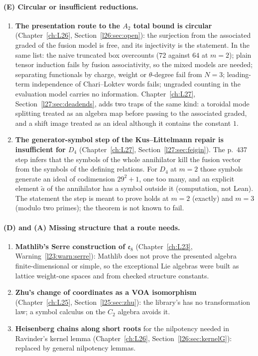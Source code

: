 \paragraph{(E) Circular or insufficient reductions.}
\begin{enumerate}
\item \textbf{The presentation route to the $A_2$ total bound is circular} (Chapter~\ref{ch:L26},
  Section~\ref{l26:sec:open}): the surjection from the associated graded of the fusion model is free, and its
  injectivity is the statement. In the same list: the naive truncated box overcounts ($72$ against $64$ at $m=2$); plain
  tensor induction fails by fusion associativity, so the mixed models are needed; separating functionals by charge,
  weight or $\theta$-degree fail from $N=3$; leading-term independence of Chari--Loktev words fails; ungraded counting in
  the evaluation model carries no information. Chapter~\ref{ch:L27}, Section~\ref{l27:sec:deadends}, adds two traps of
  the same kind: a toroidal mode splitting treated as an algebra map before passing to the associated graded, and a
  shift image treated as an ideal although it contains the constant $1$.
\item \textbf{The generator-symbol step of the Kus--Littelmann repair is insufficient for $D_4$} (Chapter~\ref{ch:L27},
  Section~\ref{l27:sec:feigin}). The p.~437 step infers that the symbols of the whole annihilator kill the fusion vector from the
  symbols of the defining relations. For $D_4$ at $m=2$ those symbols generate an ideal of codimension $29^2+1$, one too many,
  and an explicit element $\tilde a$ of the annihilator has a symbol outside it (computation, not Lean). The statement the step is
  meant to prove holds at $m=2$ (exactly) and $m=3$ (modulo two primes); the theorem is not known to fail.
\end{enumerate}

\paragraph{(D) and (A) Missing structure that a route needs.}
\begin{enumerate}
\item \textbf{Mathlib's Serre construction of $\mathfrak e_8$} (Chapter~\ref{ch:L23}, Warning~\ref{l23:warn:serre}): Mathlib
  does not prove the presented algebra finite-dimensional or simple, so the exceptional Lie algebras were built as lattice
  weight-one spaces and from checked structure constants.
\item \textbf{Zhu's change of coordinates as a VOA isomorphism} (Chapter~\ref{ch:L25}, Section~\ref{l25:sec:zhu}): the
  library's  has no transformation law; a symbol calculus on the $C_2$ algebra avoids it.
\item \textbf{Heisenberg chains along short roots} for the nilpotency needed in Ravinder's kernel lemma
  (Chapter~\ref{ch:L26}, Section~\ref{l26:sec:kernelG}): replaced by general nilpotency lemmas.
\end{enumerate}

